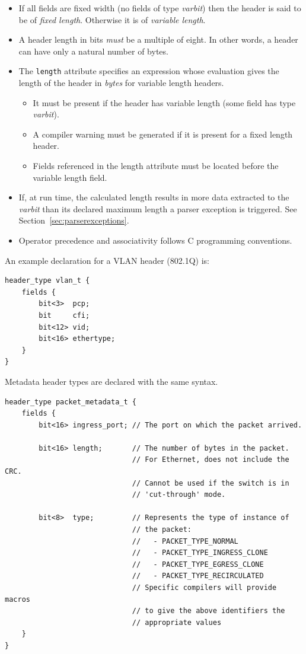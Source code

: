 \documentclass[12pt]{article}
\begin{document}
\begin{itemize}
\item
If all fields are fixed width (no fields of type \textit{varbit}) then the header is 
said to be of \textit{fixed length}. Otherwise it is of \textit{variable length}.
\item
A header length in bits \textit{must} be a multiple of eight. In other words, a 
header can have only a natural number of bytes.
\item
The \texttt{length} attribute specifies an expression whose evaluation gives
the length  of the header in \textit{bytes} for variable length headers. 
\begin{itemize}
\item
It must be present if the header has variable length (some field has type  
\textit{varbit}).
\item
A compiler warning must be generated if it is present for a fixed length header.
\item
Fields referenced in the length attribute must be located before the variable 
length field.
\end{itemize}
\item
If, at run time, the calculated length results in more data extracted to
the \textit{varbit} than its declared maximum length a parser exception is
triggered. See Section~\ref{sec:parserexceptions}.

\item
Operator precedence and associativity follows C programming conventions.
\end{itemize}

An example declaration for a VLAN header (802.1Q) is:

\begin{lstlisting}[style=P4style]
header_type vlan_t {
    fields {
        bit<3>  pcp;
        bit     cfi;
        bit<12> vid;
        bit<16> ethertype;
    }
}
\end{lstlisting}

Metadata header types are declared with the same syntax.

\begin{lstlisting}[style=P4style]
header_type packet_metadata_t {
    fields {
        bit<16> ingress_port; // The port on which the packet arrived.

        bit<16> length;       // The number of bytes in the packet. 
                              // For Ethernet, does not include the CRC. 
                              // Cannot be used if the switch is in
                              // 'cut-through' mode.

        bit<8>  type;         // Represents the type of instance of
                              // the packet: 
                              //   - PACKET_TYPE_NORMAL
                              //   - PACKET_TYPE_INGRESS_CLONE
                              //   - PACKET_TYPE_EGRESS_CLONE
                              //   - PACKET_TYPE_RECIRCULATED
                              // Specific compilers will provide macros
                              // to give the above identifiers the
                              // appropriate values
    }
}
\end{lstlisting}
\end{document}

